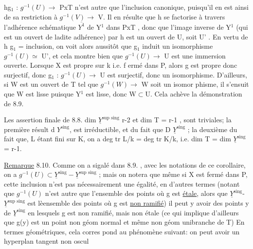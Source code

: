
hg$_1$ :  $g^{-1}(U) \longrightarrow$ PxT  n'est autre que l'inclusion canonique, puisqu'il
en est ainsi de sa restriction à $g^{-1}(V) \rightarrow$ V.  
 Il en résulte que h  se factorise
à travers l'adhérence schématique  $\overline{Y^1}$ de Y$^1$ dans  PxT , donc que
l'image inverse de Y$^1$ (qui est un ouvert de ladite adhérence) par h
est un ouvert de U, soit U' . En vertu de  h g$_1$ = inclusion, on
voit alors aussitôt que  g$_1$ induit un isomorphisme  $g^{-1}(U) \simeq$ U', et
 cela montre bien que  $g^{-1}(U) \longrightarrow$ U est une immersion ouverte.
Lorsque X est propre sur k i.e. f ermé dans P, alors  g est propre donc
surjectif, donc  g$_1$ : $g^{-1}(U) \longrightarrow$ U est surjectif, donc un isomorphisme.
D'ailleurs, si  W est un ouvert de T tel que  $g^{-1}(W) \longrightarrow$ W soit un isomor%
phisme, il s'ensuit que W est lisse puisque Y$^1$ est lisse, donc W$\subset$U.
Cela achève la démonstration de 8.9.   

  Les assertion finale de 8.8.\hand{,} dim $\underline{Y}^{\text{sup sing}}$ \unsure{$\leq$} r-2\hand{,} et
dim T = r-1 , sont triviales;  la première résult d 
  $Y^{\text{sing}}$,   est irréductible, et du fait que
 D   $\underline{Y}^{\text{sing}}$  ; la deuxième du fait que, L étant fini sur K, on a
deg tr L/k = deg tr K/k, i.e.   dim T = dim $\underline{Y}^{\text{sing}}$ = r-1.

\uline{Remarque} 8.10.  Comme on a sigalé dans  8.9. , avec les notations de
ce corollaire, on a  $g^{-1}(U) \subset \underline{Y}^{\text{sing}} - \underline{Y}^{\text{sup sing}}$ ; mais on notera que
même si X est fermé dans P,  cette inclusion n'est pas nécessairement
\placedmargin{\unsure{$\ast$}} une égalité, en d'autres termes (notant que $g^{-1}(U)$ n'est autre que
l'ensemble des points où g est \uline{étale}, alors que $\underline{Y}^{\text{sing}}$-$\underline{Y}^{\text{sup sing}}$ est
lèensemble des points où g est \uline{non ramifié}) il peut y avoir des points
y de $\underline{Y}^{\text{sing}}$ en lesquels  g est  non ramifié, mais non étale (ce qui
 implique d'ailleurs que g(y) est un point non  géom normal et même
non géom unibranche de  T)  En termes géométriques, cela corres%
pond au phénomène suivant: on peut avoir un hyperplan tangent non oscul
